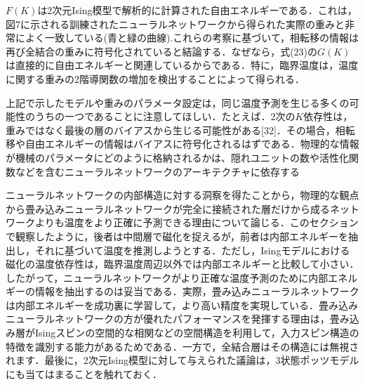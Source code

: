 \documentclass[a4paper,11pt]{jsarticle}
\begin{document}
$F(K)$は2次元Ising模型で解析的に計算された自由エネルギーである．これは，図7に示される訓練されたニューラルネットワークから得られた実際の重みと非常によく一致している(青と緑の曲線).これらの考察に基づいて，相転移の情報は再び全結合の重みに符号化されていると結論する．なぜなら，式(23)の$G(K)$は直接的に自由エネルギーと関連しているからである．特に，臨界温度は，温度に関する重みの2階導関数の増加を検出することによって得られる．\par
上記で示したモデルや重みのパラメータ設定は，同じ温度予測を生じる多くの可能性のうちの一つであることに注意してほしい．たとえば．2次の$K$依存性は，重みではなく最後の層のバイアスから生じる可能性がある[32]．その場合，相転移や自由エネルギーの情報はバイアスに符号化されるはずである．物理的な情報が機械のパラメータにどのように格納されるかは、隠れユニットの数や活性化関数などを含むニューラルネットワークのアーキテクチャに依存する\par
ニューラルネットワークの内部構造に対する洞察を得たことから，物理的な観点から畳み込みニューラルネットワークが完全に接続された層だけから成るネットワークよりも温度をより正確に予測できる理由について論じる．このセクションで観察したように，後者は中間層で磁化を捉えるが，前者は内部エネルギーを抽出し，それに基づいて温度を推測しようとする．ただし，Isingモデルにおける磁化の温度依存性は，臨界温度周辺以外では内部エネルギーと比較して小さい．したがって，ニューラルネットワークがより正確な温度予測のために内部エネルギーの情報を抽出するのは妥当である．実際，畳み込みニューラルネットワークは内部エネルギーを成功裏に学習して，より高い精度を実現している．畳み込みニューラルネットワークの方が優れたパフォーマンスを発揮する理由は，畳み込み層がIsingスピンの空間的な相関などの空間構造を利用して，入力スピン構造の特徴を識別する能力があるためである．一方で，全結合層はその構造には無視されます．最後に，2次元Ising模型に対して与えられた議論は，3状態ポッツモデルにも当てはまることを触れておく．\par
\end{document}
